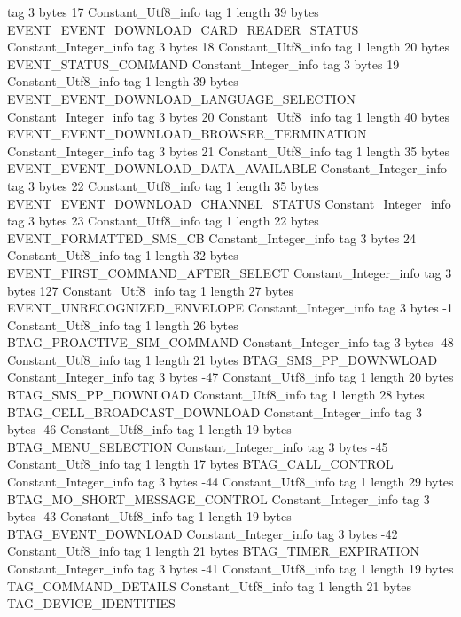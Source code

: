 {{{			tag	3
			bytes	17
		}
		Constant_Utf8_info {
			tag	1
			length	39
			bytes	EVENT_EVENT_DOWNLOAD_CARD_READER_STATUS
		}
		Constant_Integer_info {
			tag	3
			bytes	18
		}
		Constant_Utf8_info {
			tag	1
			length	20
			bytes	EVENT_STATUS_COMMAND
		}
		Constant_Integer_info {
			tag	3
			bytes	19
		}
		Constant_Utf8_info {
			tag	1
			length	39
			bytes	EVENT_EVENT_DOWNLOAD_LANGUAGE_SELECTION
		}
		Constant_Integer_info {
			tag	3
			bytes	20
		}
		Constant_Utf8_info {
			tag	1
			length	40
			bytes	EVENT_EVENT_DOWNLOAD_BROWSER_TERMINATION
		}
		Constant_Integer_info {
			tag	3
			bytes	21
		}
		Constant_Utf8_info {
			tag	1
			length	35
			bytes	EVENT_EVENT_DOWNLOAD_DATA_AVAILABLE
		}
		Constant_Integer_info {
			tag	3
			bytes	22
		}
		Constant_Utf8_info {
			tag	1
			length	35
			bytes	EVENT_EVENT_DOWNLOAD_CHANNEL_STATUS
		}
		Constant_Integer_info {
			tag	3
			bytes	23
		}
		Constant_Utf8_info {
			tag	1
			length	22
			bytes	EVENT_FORMATTED_SMS_CB
		}
		Constant_Integer_info {
			tag	3
			bytes	24
		}
		Constant_Utf8_info {
			tag	1
			length	32
			bytes	EVENT_FIRST_COMMAND_AFTER_SELECT
		}
		Constant_Integer_info {
			tag	3
			bytes	127
		}
		Constant_Utf8_info {
			tag	1
			length	27
			bytes	EVENT_UNRECOGNIZED_ENVELOPE
		}
		Constant_Integer_info {
			tag	3
			bytes	-1
		}
		Constant_Utf8_info {
			tag	1
			length	26
			bytes	BTAG_PROACTIVE_SIM_COMMAND
		}
		Constant_Integer_info {
			tag	3
			bytes	-48
		}
		Constant_Utf8_info {
			tag	1
			length	21
			bytes	BTAG_SMS_PP_DOWNWLOAD
		}
		Constant_Integer_info {
			tag	3
			bytes	-47
		}
		Constant_Utf8_info {
			tag	1
			length	20
			bytes	BTAG_SMS_PP_DOWNLOAD
		}
		Constant_Utf8_info {
			tag	1
			length	28
			bytes	BTAG_CELL_BROADCAST_DOWNLOAD
		}
		Constant_Integer_info {
			tag	3
			bytes	-46
		}
		Constant_Utf8_info {
			tag	1
			length	19
			bytes	BTAG_MENU_SELECTION
		}
		Constant_Integer_info {
			tag	3
			bytes	-45
		}
		Constant_Utf8_info {
			tag	1
			length	17
			bytes	BTAG_CALL_CONTROL
		}
		Constant_Integer_info {
			tag	3
			bytes	-44
		}
		Constant_Utf8_info {
			tag	1
			length	29
			bytes	BTAG_MO_SHORT_MESSAGE_CONTROL
		}
		Constant_Integer_info {
			tag	3
			bytes	-43
		}
		Constant_Utf8_info {
			tag	1
			length	19
			bytes	BTAG_EVENT_DOWNLOAD
		}
		Constant_Integer_info {
			tag	3
			bytes	-42
		}
		Constant_Utf8_info {
			tag	1
			length	21
			bytes	BTAG_TIMER_EXPIRATION
		}
		Constant_Integer_info {
			tag	3
			bytes	-41
		}
		Constant_Utf8_info {
			tag	1
			length	19
			bytes	TAG_COMMAND_DETAILS
		}
		Constant_Utf8_info {
			tag	1
			length	21
			bytes	TAG_DEVICE_IDENTITIES
}}}
